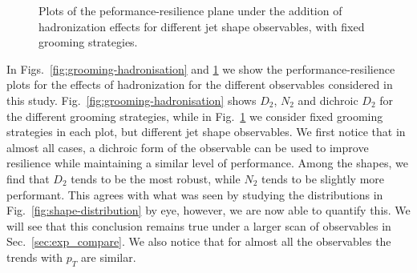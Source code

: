 \documentclass[11pt,letterpaper]{article}
\DeclareRobustCommand{\Sec}[1]{Sec.~\ref{#1}}
\DeclareRobustCommand{\Fig}[1]{Fig.~\ref{#1}}
\DeclareRobustCommand{\Figs}[2]{Figs.~\ref{#1} and \ref{#2}}
\begin{document}
\begin{figure}
  \caption{Plots of the peformance-resilience plane under the addition of hadronization effects for different jet shape observables, with fixed grooming strategies.}\label{fig:shapes-hadronisation}
\end{figure}


In \Figs{fig:grooming-hadronisation}{fig:shapes-hadronisation} we show the performance-resilience plots for the effects of hadronization for the different observables considered in this study. \Fig{fig:grooming-hadronisation} shows $D_2$, $N_2$ and dichroic $D_2$ for the different grooming strategies, while in \Fig{fig:shapes-hadronisation} we consider fixed grooming strategies in each plot, but different jet shape observables. We first notice that in almost all cases, a dichroic form of the observable can be used to improve resilience while maintaining a similar level of performance. Among the shapes, we find that $D_2$ tends to be the most robust, while $N_2$ tends to be slightly more performant. This agrees with what was seen by studying the distributions in \Fig{fig:shape-distribution} by eye, however, we are now able to quantify this. We will see that this conclusion remains true under a larger scan of observables in \Sec{sec:exp_compare}. We also notice that for almost all the observables the trends with $p_T$ are similar.
\end{document}
